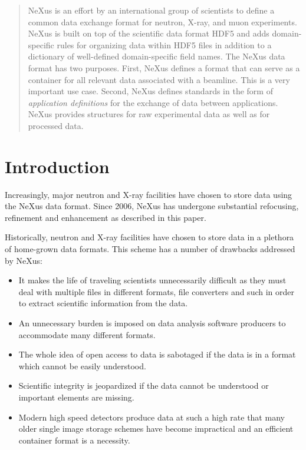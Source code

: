 \documentclass[%
 aip,
rsi,
 amsmath,amssymb,
 reprint,%
]{revtex4-1}
\begin{document}
\begin{abstract}
NeXus is an effort by an international group of scientists to define 
 a common data exchange format for neutron, X-ray, and muon experiments.   
NeXus is built on top of the scientific data format HDF5 and adds 
domain-specific 
rules for organizing data within HDF5 files in addition to a dictionary of well-defined 
domain-specific field names. The NeXus data format has two purposes.  First, NeXus defines a
format that can serve as a container for all relevant data associated
with a beamline. This is a very important use case.  Second, NeXus
defines standards in the form of \emph{application definitions} for the
exchange of data between applications.  NeXus provides structures for raw experimental data as well as for processed data.  
\end{abstract}

\maketitle


\section{Introduction}
Increasingly, major neutron and X-ray facilities have chosen to store data using the NeXus data format. 
Since 2006, NeXus\cite{nxold} has undergone substantial refocusing, 
refinement and enhancement as described in this paper.  

Historically, neutron and X-ray facilities have chosen to store data in a plethora of 
home-grown data formats. This scheme has a number of drawbacks addressed by NeXus: 
\begin{itemize}
\item It makes the life of traveling scientists unnecessarily difficult as they must deal with multiple files 
 in different formats, file converters and such in order to extract scientific information from the data.
 \item An unnecessary burden is imposed on data analysis software producers to accommodate many different formats.  
\item The whole idea of open access to data is sabotaged if the data is in a format which cannot be easily understood.
\item Scientific integrity is jeopardized if the data cannot be understood or important elements are missing.
\item Modern high speed detectors produce data at such a high rate that many older single image storage schemes 
 have become impractical and 
 an efficient container format is a necessity. 
\end{itemize}
\end{document}
